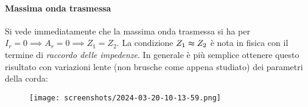 \paragraph{Massima onda trasmessa}
Si vede immediatamente che la massima onda trasmessa si ha per \(I_r=0 \implies A_r = 0 \implies Z_1 = Z_2\). La condizione \(Z_1\thickapprox Z_2\) è nota in fisica con il termine di \emph{raccordo delle impedenze}. In generale è più semplice ottenere questo risultato con variazioni lente (non brusche come appena studiato) dei parametri della corda:
\begin{figure}[H]
	\centering
	\texttt{[image: screenshots/2024-03-20-10-13-59.png]}
\end{figure}
